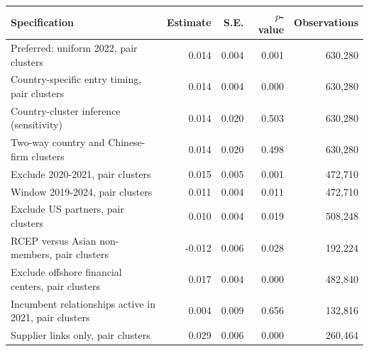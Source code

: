 \begin{tabular}{lrrrr}
\toprule
Specification & Estimate & S.E. & $p$-value & Observations \\
\midrule
Preferred: uniform 2022, pair clusters & 0.014 & 0.004 & 0.001 & 630,280 \\
Country-specific entry timing, pair clusters & 0.014 & 0.004 & 0.000 & 630,280 \\
Country-cluster inference (sensitivity) & 0.014 & 0.020 & 0.503 & 630,280 \\
Two-way country and Chinese-firm clusters & 0.014 & 0.020 & 0.498 & 630,280 \\
Exclude 2020-2021, pair clusters & 0.015 & 0.005 & 0.001 & 472,710 \\
Window 2019-2024, pair clusters & 0.011 & 0.004 & 0.011 & 472,710 \\
Exclude US partners, pair clusters & 0.010 & 0.004 & 0.019 & 508,248 \\
RCEP versus Asian non-members, pair clusters & -0.012 & 0.006 & 0.028 & 192,224 \\
Exclude offshore financial centers, pair clusters & 0.017 & 0.004 & 0.000 & 482,840 \\
Incumbent relationships active in 2021, pair clusters & 0.004 & 0.009 & 0.656 & 132,816 \\
Supplier links only, pair clusters & 0.029 & 0.006 & 0.000 & 260,464 \\
\bottomrule
\end{tabular}